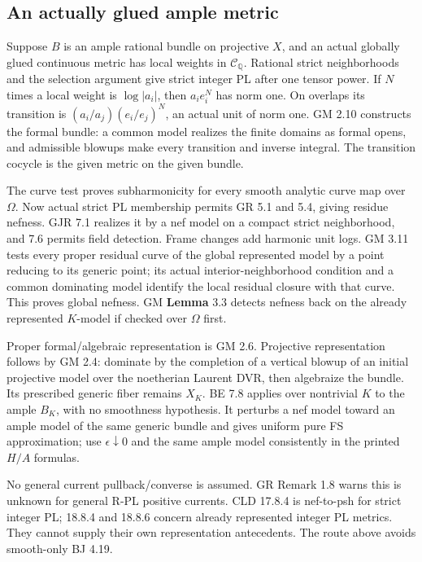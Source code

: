 \documentclass[
  10pt,
]{article}
\begin{document}
\subsection{An actually glued ample
metric}\label{an-actually-glued-ample-metric}

Suppose \(B\) is an ample rational bundle on projective \(X\), and an
actual globally glued continuous metric has local weights in
\(\mathcal C_{\mathbb Q}\). Rational strict neighborhoods and the
selection argument give strict integer PL after one tensor power. If
\(N\) times a local weight is \(\log|a_i|\), then \(a_i e_i^N\) has norm
one. On overlaps its transition is \((a_i/a_j)(e_i/e_j)^N\), an actual
unit of norm one. GM 2.10 constructs the formal bundle: a common model
realizes the finite domains as formal opens, and admissible blowups make
every transition and inverse integral. The transition cocycle is the
given metric on the given bundle.

The curve test proves subharmonicity for every smooth analytic curve map
over \(\Omega\). Now actual strict PL membership permits GR 5.1 and 5.4,
giving residue nefness. GJR 7.1 realizes it by a nef model on a compact
strict neighborhood, and 7.6 permits field detection. Frame changes add
harmonic unit logs. GM 3.11 tests every proper residual curve of the
global represented model by a point reducing to its generic point; its
actual interior-neighborhood condition and a common dominating model
identify the local residual closure with that curve. This proves global
nefness. GM \textbf{Lemma} 3.3 detects nefness back on the already
represented \(K\)-model if checked over \(\Omega\) first.

Proper formal/algebraic representation is GM 2.6. Projective
representation follows by GM 2.4: dominate by the completion of a
vertical blowup of an initial projective model over the noetherian
Laurent DVR, then algebraize the bundle. Its prescribed generic fiber
remains \(X_K\). BE 7.8 applies over nontrivial \(K\) to the ample
\(B_K\), with no smoothness hypothesis. It perturbs a nef model toward
an ample model of the same generic bundle and gives uniform pure FS
approximation; use \(\epsilon\downarrow0\) and the same ample model
consistently in the printed \(H/A\) formulas.

No general current pullback/converse is assumed. GR Remark 1.8 warns
this is unknown for general R-PL positive currents. CLD 17.8.4 is
nef-to-psh for strict integer PL; 18.8.4 and 18.8.6 concern already
represented integer PL metrics. They cannot supply their own
representation antecedents. The route above avoids smooth-only BJ 4.19.
\end{document}
